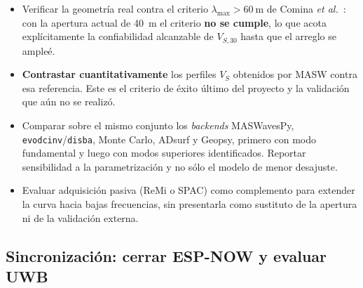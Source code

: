 \begin{itemize}[itemsep=0.15em]
    gestionar el acceso a esa informaci\'on con la Facultad antes de que la obra, si
    ocurre, se ejecute sin registro geof\'isico.
    \item Verificar la geometr\'ia real contra el criterio $\lambda_{\max}>\SI{60}{\meter}$
    de Comina \emph{et al.}~\cite{Comina2011}: con la apertura actual de
    \SI{40}{\meter} el criterio \textbf{no se cumple}, lo que acota expl\'icitamente la
    confiabilidad alcanzable de $V_{S,30}$ hasta que el arreglo se ample\'e.
    \item \textbf{Contrastar cuantitativamente} los perfiles $V_S$ obtenidos por MASW
    contra esa referencia. Este es el criterio de \'exito \'ultimo del proyecto y la
    validaci\'on que a\'un no se realiz\'o.
    \item Comparar sobre el mismo conjunto los \emph{backends} MASWavesPy,
    \texttt{evodcinv}/\texttt{disba}, Monte Carlo, ADsurf y Geopsy, primero con modo
    fundamental y luego con modos superiores identificados. Reportar sensibilidad a la
    parametrizaci\'on y no s\'olo el modelo de menor desajuste.
    \item Evaluar adquisici\'on pasiva (ReMi o SPAC) como complemento para extender la
    curva hacia bajas frecuencias, sin presentarla como sustituto de la apertura ni de la
    validaci\'on externa.
\end{itemize}

\subsection{Sincronizaci\'on: cerrar ESP-NOW y evaluar UWB}

